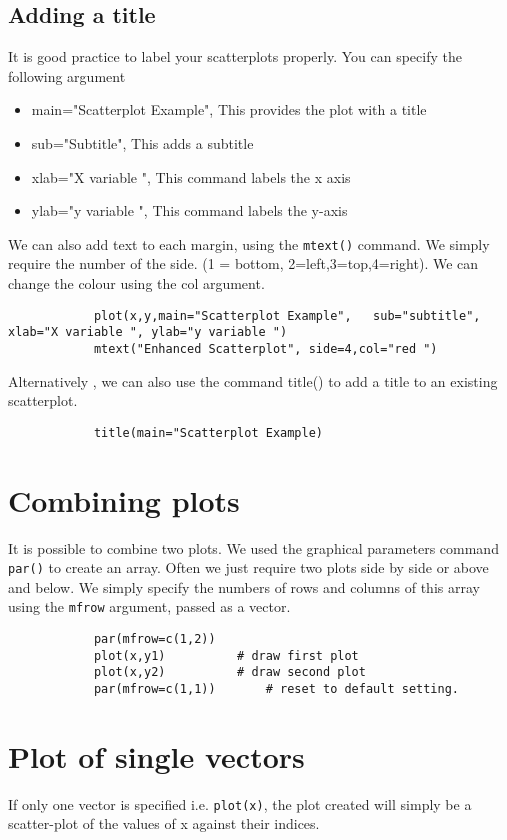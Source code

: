 			\subsection{Adding a title }
			
			It is good practice to label your scatterplots properly. You can specify the following argument
			\begin{itemize}
				\item	main="Scatterplot Example", 	This provides the plot with a title
				\item	sub="Subtitle",                 This adds a subtitle
				\item	xlab="X variable ",				This command labels the x axis 
				\item   ylab="y variable ",				This command labels the y-axis
			\end{itemize}
			We can also add text to each margin, using the \texttt{mtext()} command.  
			We simply require the number of the side. (1 = bottom, 2=left,3=top,4=right). 
			We can change the colour using the col argument.
			\footnotesize \begin{verbatim}
			plot(x,y,main="Scatterplot Example",   sub="subtitle",    xlab="X variable ", ylab="y variable ")	
			mtext("Enhanced Scatterplot", side=4,col="red ")
			\end{verbatim}\normalsize
			Alternatively , we can also use the command title() to add a title to an existing scatterplot.
			\footnotesize \begin{verbatim}
			title(main="Scatterplot Example)	
			\end{verbatim}\normalsize
			
			
			\section{Combining plots}
			It is possible to combine two plots. We used the graphical parameters command \texttt{par()} to create an array. 
			Often we just require two plots side by side or above and below. We simply specify the numbers of rows and columns of this array using the \texttt{mfrow} argument, passed as a vector.
			
			\begin{verbatim}
			par(mfrow=c(1,2))
			plot(x,y1)			# draw first plot
			plot(x,y2)			# draw second plot
			par(mfrow=c(1,1))		# reset to default setting.
			\end{verbatim}
			
			\section{Plot of single vectors}
			If only one vector is specified i.e. \texttt{plot(x)},  the plot created will simply be a scatter-plot of the values of x against their indices.
			
